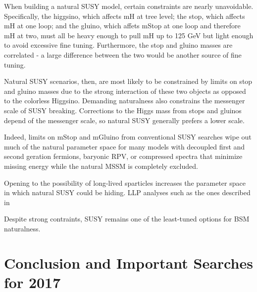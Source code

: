 \documentclass[12pt]{article}
\begin{document}
    When building a natural SUSY model, certain constraints are nearly unavoidable. Specifically, the higgsino, which affects mH at tree level; the stop, which affects mH at one loop; and the gluino, which affets mStop at one loop and therefore mH at two, must all be heavy enough to pull mH up to 125 GeV but light enough to avoid excessive fine tuning. Furthermore, the stop and gluino masses are correlated - a large difference between the two would be another source of fine tuning.

    Natural SUSY scenarios, then, are most likely to be constrained by limits on stop and gluino masses due to the strong interaction of these two objects as opposed to the colorless Higgsino. Demanding naturalness also constrains the messenger scale of SUSY breaking. Corrections to the Higgs mass from stops and gluinos depend of the messenger scale, so natural SUSY generally prefers a lower scale.  

    Indeed, limits on mStop and mGluino from conventional SUSY searches wipe out much of the natural parameter space for many models with decoupled first and second geration fermions, baryonic RPV, or compressed spectra that minimize missing energy while the natural MSSM is completely excluded.  

    Opening to the possibility of long-lived sparticles increases the parameter space in which natural SUSY could be hiding. LLP analyses such as the ones described in    

    Despite strong contraints, SUSY remains one of the least-tuned options for BSM naturalness.    

\section{Conclusion and Important Searches for 2017}

\clearpage
\pagebreak
\singlespacing
{}

\end{document}
